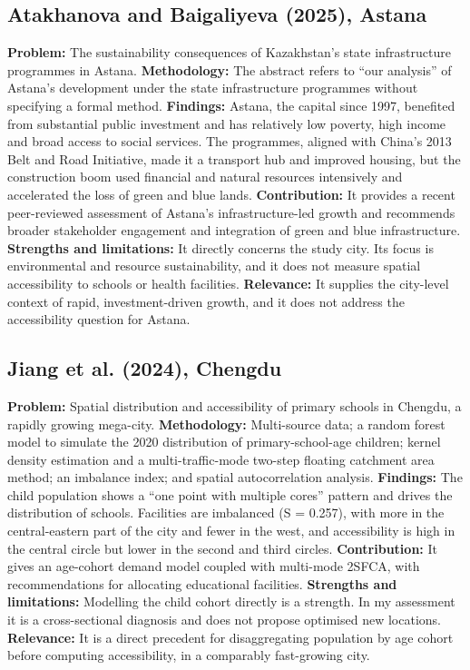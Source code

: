 \documentclass[pdflatex,sn-mathphys-num]{sn-jnl}
\begin{document}
\subsection{Atakhanova and Baigaliyeva (2025), Astana \cite{astana2025}}
\textbf{Problem:} The sustainability consequences of Kazakhstan's state infrastructure programmes in Astana.
\textbf{Methodology:} The abstract refers to ``our analysis'' of Astana's development under the state infrastructure programmes without specifying a formal method.
\textbf{Findings:} Astana, the capital since 1997, benefited from substantial public investment and has relatively low poverty, high income and broad access to social services. The programmes, aligned with China's 2013 Belt and Road Initiative, made it a transport hub and improved housing, but the construction boom used financial and natural resources intensively and accelerated the loss of green and blue lands.
\textbf{Contribution:} It provides a recent peer-reviewed assessment of Astana's infrastructure-led growth and recommends broader stakeholder engagement and integration of green and blue infrastructure.
\textbf{Strengths and limitations:} It directly concerns the study city. Its focus is environmental and resource sustainability, and it does not measure spatial accessibility to schools or health facilities.
\textbf{Relevance:} It supplies the city-level context of rapid, investment-driven growth, and it does not address the accessibility question for Astana.

\subsection{Jiang et al. (2024), Chengdu \cite{chengdu2024}}
\textbf{Problem:} Spatial distribution and accessibility of primary schools in Chengdu, a rapidly growing mega-city.
\textbf{Methodology:} Multi-source data; a random forest model to simulate the 2020 distribution of primary-school-age children; kernel density estimation and a multi-traffic-mode two-step floating catchment area method; an imbalance index; and spatial autocorrelation analysis.
\textbf{Findings:} The child population shows a ``one point with multiple cores'' pattern and drives the distribution of schools. Facilities are imbalanced (S = 0.257), with more in the central-eastern part of the city and fewer in the west, and accessibility is high in the central circle but lower in the second and third circles.
\textbf{Contribution:} It gives an age-cohort demand model coupled with multi-mode 2SFCA, with recommendations for allocating educational facilities.
\textbf{Strengths and limitations:} Modelling the child cohort directly is a strength. In my assessment it is a cross-sectional diagnosis and does not propose optimised new locations.
\textbf{Relevance:} It is a direct precedent for disaggregating population by age cohort before computing accessibility, in a comparably fast-growing city.
\end{document}
